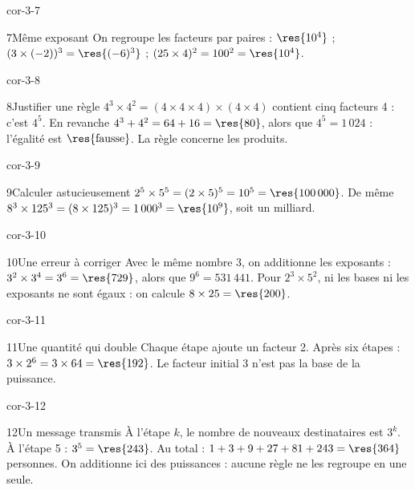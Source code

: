 \begin{blocLivre}{cor-3-7}\begin{corrige}{7}{Même exposant}
On regroupe les facteurs par paires : $\res{10^4}$ ; $(3\times(-2))^3=\res{(-6)^3}$ ; $(25\times4)^2=100^2=\res{10^4}$.
\end{corrige}\end{blocLivre}
\begin{blocLivre}{cor-3-8}\begin{corrige}{8}{Justifier une règle}
$4^3\times4^2=(4\times4\times4)\times(4\times4)$ contient cinq facteurs 4 : c’est $4^5$. En revanche $4^3+4^2=64+16=\res{80}$, alors que $4^5=1\,024$ : l’égalité est $\res{\text{fausse}}$. La règle concerne les produits.
\end{corrige}\end{blocLivre}
\begin{blocLivre}{cor-3-9}\begin{corrige}{9}{Calculer astucieusement}
$2^5\times5^5=(2\times5)^5=10^5=\res{100\,000}$. De même $8^3\times125^3=(8\times125)^3=1\,000^3=\res{10^9}$, soit un milliard.
\end{corrige}\end{blocLivre}
\begin{blocLivre}{cor-3-10}\begin{corrige}{10}{Une erreur à corriger}
Avec le même nombre 3, on additionne les exposants : $3^2\times3^4=3^6=\res{729}$, alors que $9^6=531\,441$. Pour $2^3\times5^2$, ni les bases ni les exposants ne sont égaux : on calcule $8\times25=\res{200}$.
\end{corrige}\end{blocLivre}
\begin{blocLivre}{cor-3-11}\begin{corrige}{11}{Une quantité qui double}
Chaque étape ajoute un facteur 2. Après six étapes : $3\times2^6=3\times64=\res{192}$. Le facteur initial 3 n’est pas la base de la puissance.
\end{corrige}\end{blocLivre}
\begin{blocLivre}{cor-3-12}\begin{corrige}{12}{Un message transmis}
À l’étape $k$, le nombre de nouveaux destinataires est $3^k$. À l’étape 5 : $3^5=\res{243}$. Au total : $1+3+9+27+81+243=\res{364}$ personnes. On additionne ici des puissances : aucune règle ne les regroupe en une seule.
\end{corrige}\end{blocLivre}
